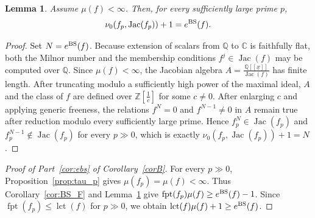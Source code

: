 \documentclass{article}
\newtheorem{lemma}[theorem]{Lemma}
\newtheorem{remark}[theorem]{Remark}
\DeclareMathOperator{\Jac}{Jac}
\DeclareMathOperator{\fpt}{fpt}
\DeclareMathOperator{\lct}{lct}
\numberwithin{theorem}{section}
\begin{document}
\begin{lemma}\label{lem:nu_E_BS}
Assume $\mu(f)<\infty$. Then, for every sufficiently large prime $p$,
\[
\nu_0(f_p,\Jac(f_p))+1=e^{\textup{BS}}(f).
\]
\end{lemma}

\begin{proof}
Set $N=e^{\textup{BS}}(f)$. Because extension of scalars from $\mathbb{Q}$ to $\mathbb{C}$ is faithfully flat, both the Milnor number and the membership conditions $f^j\in\Jac(f)$ may be computed over $\mathbb{Q}$. Since $\mu(f)<\infty$, the Jacobian algebra $A=\frac{\mathbb{Q}[[\underline{x}]]}{\Jac(f)}$ has finite length. After truncating modulo a sufficiently high power of the maximal ideal, $A$ and the class of $f$ are defined over $\mathbb{Z}[\frac{1}{c}]$ for some $c\neq0$. After enlarging $c$ and applying generic freeness, the relations $f^N=0$ and $f^{N-1}\neq0$ in $A$ remain true after reduction modulo every sufficiently large prime. Hence $f_p^N\in\Jac(f_p)$ and $f_p^{N-1}\notin\Jac(f_p)$ for every $p\gg0$, which is exactly $\nu_0(f_p,\Jac(f_p))+1=N$.
\end{proof}

\begin{proof}[Proof of Part~\ref{cor:ebs} of Corollary~\ref{corB}]
For every $p\gg0$, Proposition~\ref{prop:tau_p} gives $\mu(f_p)=\mu(f)<\infty$. Thus Corollary~\ref{cor:BS_F} and Lemma~\ref{lem:nu_E_BS} give $\fpt(f_p)\mu(f)\geq e^{\textup{BS}}(f)-1$. Since $\fpt(f_p)\leq\lct(f)$ for $p\gg0$, we obtain $\lct(f)\mu(f)+1\geq e^{\textup{BS}}(f)$.
\end{proof}


\end{document}
